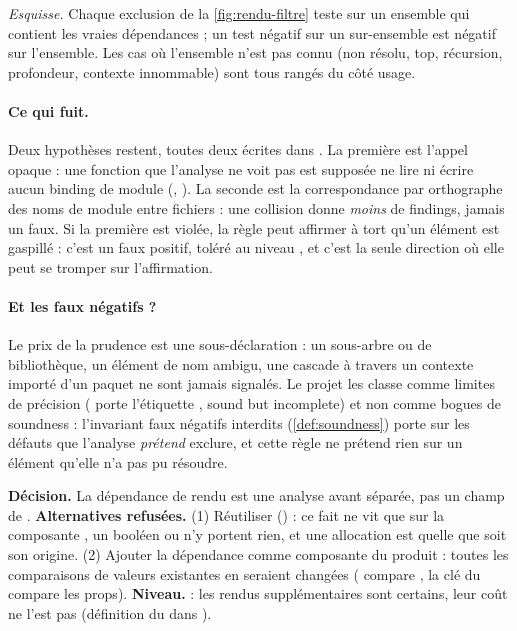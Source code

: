 \noindent\textit{Esquisse.} Chaque exclusion de la \cref{fig:rendu-filtre} teste 
sur un ensemble qui contient les vraies dépendances ; un test négatif sur un sur-ensemble est
négatif sur l'ensemble. Les cas où l'ensemble n'est pas connu (non résolu, top, récursion,
profondeur, contexte innommable) sont tous rangés du côté \og usage\fg{}.

\paragraph{Ce qui fuit.} Deux hypothèses restent, toutes deux écrites dans . La première
est l'appel opaque : une fonction que l'analyse ne voit pas est supposée ne lire ni écrire aucun
binding de module (, ). La seconde est la correspondance par orthographe des
noms de module entre fichiers : une collision donne \emph{moins} de findings, jamais un faux. Si
la première est violée, la règle peut affirmer à tort qu'un élément est gaspillé : c'est un faux
positif, toléré au niveau \Warning{}, et c'est la seule direction où elle peut se tromper sur
l'affirmation.

\paragraph{Et les faux négatifs ?} Le prix de la prudence est une sous-déclaration : un sous-arbre
 ou de bibliothèque, un élément de nom ambigu, une cascade à travers un contexte
importé d'un paquet ne sont jamais signalés. Le projet les classe comme limites de précision
( porte l'étiquette , \og sound but incomplete\fg{}) et non comme
bogues de soundness : l'invariant \og faux négatifs interdits\fg{} (\cref{def:soundness}) porte
sur les défauts que l'analyse \emph{prétend} exclure, et cette règle ne prétend rien sur un
élément qu'elle n'a pas pu résoudre.

\begin{decision}[ADR-041 §1–§3]
\textbf{Décision.} La dépendance de rendu est une analyse avant séparée, pas un champ de
. \textbf{Alternatives refusées.} (1) Réutiliser 
() : ce fait ne vit que sur la composante , un booléen ou
 n'y portent rien, et une allocation est  quelle que soit son
origine. (2) Ajouter la dépendance comme composante du produit : toutes les comparaisons de
valeurs existantes en seraient changées ( compare ,
la clé du  compare les props). \textbf{Niveau.} \Warning{} : les rendus
supplémentaires sont certains, leur coût ne l'est pas (définition du \Warning{} dans
).
\end{decision}

